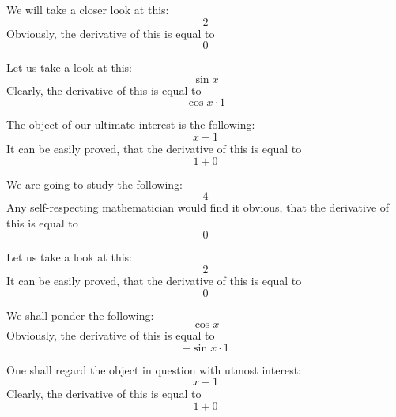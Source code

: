 \documentclass{article}
\begin{document}
We will take a closer look at this:
\begin{equation}
2 
\end{equation}
Obviously, the derivative of this is equal to
\begin{equation}
0 
\end{equation}

Let us take a look at this:
\begin{equation}
\sin x 
\end{equation}
Clearly, the derivative of this is equal to
\begin{equation}
\cos x \cdot 1 
\end{equation}

The object of our ultimate interest is the following:
\begin{equation}
x + 1 
\end{equation}
It can be easily proved, that the derivative of this is equal to
\begin{equation}
1 + 0 
\end{equation}

We are going to study the following:
\begin{equation}
4 
\end{equation}
Any self-respecting mathematician would find it obvious, that the derivative of this is equal to
\begin{equation}
0 
\end{equation}

Let us take a look at this:
\begin{equation}
2 
\end{equation}
It can be easily proved, that the derivative of this is equal to
\begin{equation}
0 
\end{equation}

We shall ponder the following:
\begin{equation}
\cos x 
\end{equation}
Obviously, the derivative of this is equal to
\begin{equation}
-\sin x \cdot 1 
\end{equation}

One shall regard the object in question with utmost interest:
\begin{equation}
x + 1 
\end{equation}
Clearly, the derivative of this is equal to
\begin{equation}
1 + 0 
\end{equation}
\end{document}
